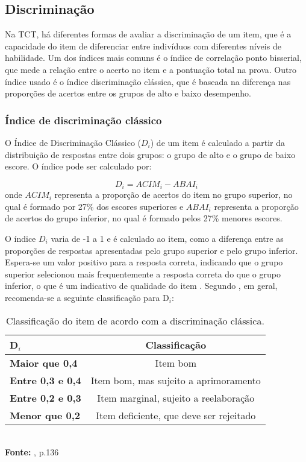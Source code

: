 \subsection{Discriminação}

Na TCT, há diferentes formas de avaliar a discriminação de um item, que é a capacidade do item de diferenciar entre indivíduos com diferentes níveis de habilidade. Um dos índices mais comuns é o índice de correlação ponto bisserial, que mede a relação entre o acerto no item e a pontuação total na prova. Outro índice usado é o índice discriminação clássica, que é baseada na diferença nas proporções de acertos entre os grupos de alto e baixo desempenho.

\subsubsection{Índice de discriminação clássico}

O Índice de Discriminação Clássico ($D_i$) de um item é calculado a partir da distribuição de respostas entre dois grupos: o grupo de alto e o grupo de baixo escore.
O índice pode ser calculado por: 

\[D_i =  ACIM_i - ABAI_i\] onde $ACIM_i$ representa a proporção de acertos do item no grupo superior, no qual é formado por 27\% dos escores superiores e $ABAI_i$   representa a proporção de acertos do grupo inferior, no qual é formado pelos 27\% menores escores. 

 O índice $D_i$ varia de -1 a 1 e é calculado ao item, como a diferença entre as proporções de respostas apresentadas pelo grupo superior e pelo grupo inferior. Espera-se um valor positivo para a resposta correta, indicando que o grupo superior selecionou mais frequentemente a resposta correta do que o grupo inferior, o que é um indicativo de qualidade do item  \cite{de1983consideraccoes}. Segundo , em geral, recomenda-se a seguinte classificação para D$_i$:

\begin{table}[!htb]
	\centering
		\caption{Classificação do item de acordo com a discriminação clássica.}
		\label{class-disc-classica}
		\begin{tabular}{lc}
			\hline
		\textbf{D$_i$}  &	\textbf{Classificação}    \\ 
			\hline
		\textbf{Maior que 0,4 }&  Item bom    \\ 
			\hline
			\textbf{Entre 0,3 e 0,4 }&  Item bom, mas sujeito a aprimoramento  \\ 
			\hline
			\textbf{Entre 0,2 e 0,3} & Item marginal, sujeito a reelaboração  \\ 
			\hline
		\textbf{Menor que 0,2} & Item deficiente, que deve ser rejeitado   \\ 
			\hline
		\end{tabular}\\
				\vspace*{0.5cm}
		\small{\textbf{Fonte:} , p.136}
\end{table}


